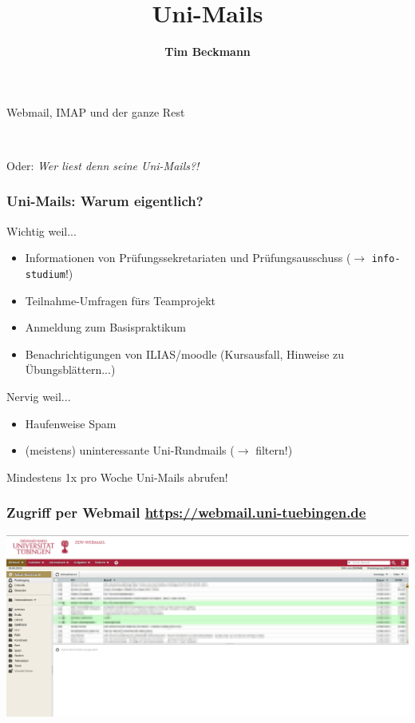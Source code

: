 \documentclass[glossy,aspectratio=169]{beamer}
\title{Uni-Mails}
\author{\textbf{Tim Beckmann}}
\begin{document}
	\begin{frame}
		\centering
		\vspace*{1cm}
		\begin{huge}
			Webmail, IMAP und der ganze Rest
		\end{huge}\\
		\vspace*{1cm}
		\begin{large}
			Oder: \emph{Wer liest denn seine Uni-Mails?!}
		\end{large}
	\end{frame}

	\begin{frame}
		\frametitle{Uni-Mails: Warum eigentlich?}
		\begin{block}{Wichtig weil...}
			\begin{itemize}[<+->]
				\item Informationen von Prüfungssekretariaten und Prüfungsausschuss ($\rightarrow$ \texttt{info-studium}!)
				\item Teilnahme-Umfragen fürs Teamprojekt
				\item Anmeldung zum Basispraktikum
				\item Benachrichtigungen von ILIAS/moodle (Kursausfall, Hinweise zu Übungsblättern...)
			\end{itemize}
		\end{block}
		\pause
		\begin{alertblock}{Nervig weil...}
			\begin{itemize}[<+->]
				\item Haufenweise Spam
				\item (meistens) uninteressante Uni-Rundmails ($\rightarrow$ filtern!)
			\end{itemize}
		\end{alertblock}
	\end{frame}

	\begin{frame}
		\centering
		\huge Mindestens 1x pro Woche Uni-Mails abrufen!
	\end{frame}

	\begin{frame}
	\frametitle{Zugriff per Webmail \quad \url{https://webmail.uni-tuebingen.de}}
	\centering
	\includegraphics[width=\textwidth]{pictures/webmail.png}
	\end{frame}
\end{document}
